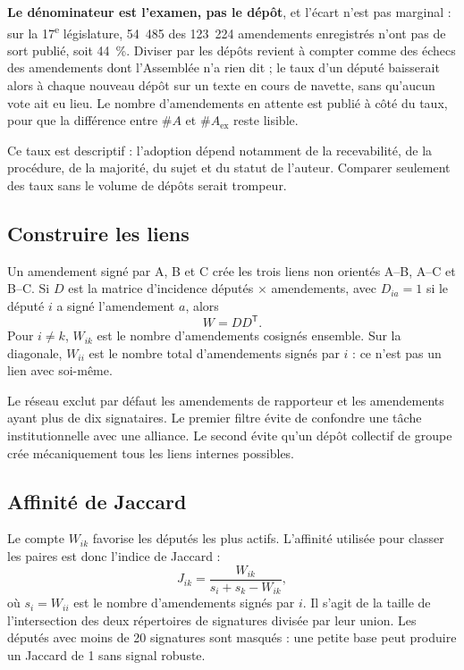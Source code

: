 \documentclass[11pt,a4paper]{article}
\begin{document}
\textbf{Le dénominateur est l'examen, pas le dépôt}, et l'écart n'est pas
marginal : sur la 17\textsuperscript{e} législature, 54~485 des 123~224
amendements enregistrés n'ont pas de sort publié, soit 44~\%. Diviser par les
dépôts revient à compter comme des échecs des amendements dont l'Assemblée n'a
rien dit ; le taux d'un député baisserait alors à chaque nouveau dépôt sur un
texte en cours de navette, sans qu'aucun vote ait eu lieu. Le nombre
d'amendements en attente est publié à côté du taux, pour que la différence
entre $\#A$ et $\#A_{\mathrm{ex}}$ reste lisible.

Ce taux est descriptif : l'adoption dépend notamment de la recevabilité, de la
procédure, de la majorité, du sujet et du statut de l'auteur. Comparer seulement
des taux sans le volume de dépôts serait trompeur.

\subsection{Construire les liens}

Un amendement signé par A, B et C crée les trois liens non orientés A--B,
A--C et B--C. Si $D$ est la matrice d'incidence députés $\times$ amendements,
avec $D_{ia}=1$ si le député $i$ a signé l'amendement $a$, alors
\[
 W=DD^{\mathsf T}.
\]
Pour $i\neq k$, $W_{ik}$ est le nombre d'amendements cosignés ensemble. Sur la
diagonale, $W_{ii}$ est le nombre total d'amendements signés par $i$ : ce n'est
pas un lien avec soi-même.

Le réseau exclut par défaut les amendements de rapporteur et les amendements
ayant plus de dix signataires. Le premier filtre évite de confondre une tâche
institutionnelle avec une alliance. Le second évite qu'un dépôt collectif de
groupe crée mécaniquement tous les liens internes possibles.

\subsection{Affinité de Jaccard}

Le compte $W_{ik}$ favorise les députés les plus actifs. L'affinité utilisée
pour classer les paires est donc l'indice de Jaccard :
\[
 J_{ik}=\frac{W_{ik}}{s_i+s_k-W_{ik}},
\]
où $s_i=W_{ii}$ est le nombre d'amendements signés par $i$. Il s'agit de la
taille de l'intersection des deux répertoires de signatures divisée par leur
union. Les députés avec moins de 20 signatures sont masqués : une petite base
peut produire un Jaccard de 1 sans signal robuste.
\end{document}
